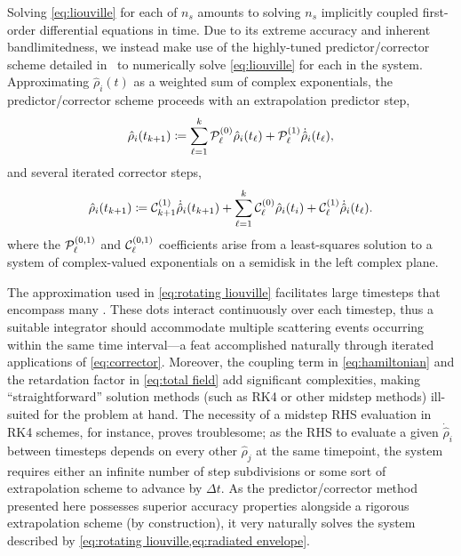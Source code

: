 Solving \cref{eq:liouville} for each of $n_s$ \qds{} amounts to solving $n_s$ implicitly coupled first-order differential equations in time.
Due to its extreme accuracy and inherent bandlimitedness, we instead make use of the highly-tuned predictor/corrector scheme detailed in~\cite{Glaser2009} to numerically solve \cref{eq:liouville} for each \qd{} in the system.
Approximating $\hat{\rho}_i(t)$ as a weighted sum of complex exponentials, the predictor/corrector scheme proceeds with an extrapolation predictor step,
\begin{equation}
  \hat{\rho}_i(t_{k + 1}) \coloneqq \sum_{\ell = 1}^k \mathcal{P}_\ell^{\qty(0)} \hat{\rho}_i(t_\ell) + \mathcal{P}_\ell^{\qty(1)} \dot{\hat{\rho}}_i(t_\ell),
  \label{eq:predictor}
\end{equation}
and several iterated corrector steps,
\begin{equation}
  \hat{\rho}_i(t_{k + 1}) \coloneqq \mathcal{C}_{k+1}^{\qty(1)} \dot{\hat{\rho}}_i(t_{k + 1}) + \sum_{\ell = 1}^k \mathcal{C}_\ell^{\qty(0)} \hat{\rho}_i(t_i) + \mathcal{C}_\ell^{\qty(1)} \dot{\hat{\rho}}_i(t_\ell).
  \label{eq:corrector}
\end{equation}
where the $\mathcal{P}_\ell^{\qty(0, 1)}$ and $\mathcal{C}_\ell^{\qty(0, 1)}$ coefficients arise from a least-squares solution to a system of complex-valued exponentials on a semidisk in the left complex plane.

The approximation used in \cref{eq:rotating liouville} facilitates large timesteps that encompass many \qds{}.
These dots interact continuously over each timestep, thus a suitable integrator should accommodate multiple scattering events occurring within the same time interval---a feat accomplished naturally through iterated applications of \cref{eq:corrector}.
Moreover, the coupling term in \cref{eq:hamiltonian} and the retardation factor in \cref{eq:total field} add significant complexities, making ``straightforward'' solution methods (such as RK4 or other midstep methods) ill-suited for the problem at hand.
The necessity of a midstep RHS evaluation in RK4 schemes, for instance, proves troublesome; as the RHS to evaluate a given $\dot{\hat{\rho}}_i$ between timesteps depends on every other $\hat{\rho}_j$ at the same timepoint, the system requires either an infinite number of step subdivisions or some sort of extrapolation scheme to advance by $\Delta t$.
As the predictor/corrector method presented here possesses superior accuracy properties alongside a rigorous extrapolation scheme (by construction), it very naturally solves the system described by \cref{eq:rotating liouville,eq:radiated envelope}.

